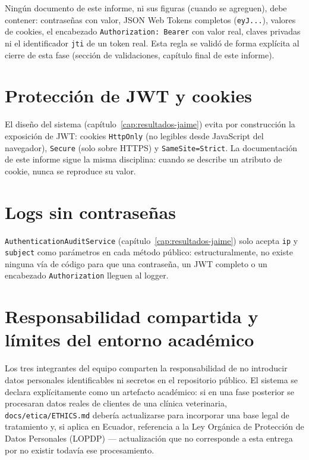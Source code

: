 Ning\'un documento de este informe, ni sus figuras (cuando se agreguen),
debe contener: contrase\~nas con valor, JSON Web Tokens completos
(\texttt{eyJ...}), valores de cookies, el encabezado
\texttt{Authorization: Bearer} con valor real, claves privadas ni el
identificador \texttt{jti} de un token real. Esta regla se valid\'o de
forma expl\'icita al cierre de esta fase (secci\'on de validaciones,
cap\'itulo final de este informe).

\section{Protecci\'on de JWT y cookies}

El dise\~no del sistema (cap\'itulo~\ref{cap:resultados-jaime}) evita por
construcci\'on la exposici\'on de JWT: cookies \texttt{HttpOnly} (no
legibles desde JavaScript del navegador), \texttt{Secure} (solo sobre
HTTPS) y \texttt{SameSite=Strict}. La documentaci\'on de este informe sigue
la misma disciplina: cuando se describe un atributo de cookie, nunca se
reproduce su valor.

\section{Logs sin contrase\~nas}

\texttt{AuthenticationAuditService} (cap\'itulo~\ref{cap:resultados-jaime})
solo acepta \texttt{ip} y \texttt{subject} como par\'ametros en cada
m\'etodo p\'ublico: estructuralmente, no existe ninguna v\'ia de c\'odigo
para que una contrase\~na, un JWT completo o un encabezado
\texttt{Authorization} lleguen al logger.

\section{Responsabilidad compartida y l\'imites del entorno acad\'emico}

Los tres integrantes del equipo comparten la responsabilidad de no
introducir datos personales identificables ni secretos en el repositorio
p\'ublico. El sistema se declara expl\'icitamente como un artefacto
acad\'emico: si en una fase posterior se procesaran datos reales de
clientes de una cl\'inica veterinaria, \texttt{docs/etica/ETHICS.md}
deber\'ia actualizarse para incorporar una base legal de tratamiento y,
si aplica en Ecuador, referencia a la Ley Org\'anica de Protecci\'on de
Datos Personales (LOPDP) --- actualizaci\'on que no corresponde a esta
entrega por no existir todav\'ia ese procesamiento.

